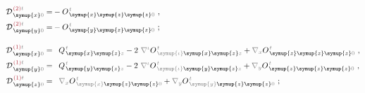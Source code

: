 \begin{subequations} \label{eq:D^(2-0)_0=}
\begin{align}
	{\mathcal{D}}^{\;\!\textcolor{Maroon}{(2)}\mathcolor{gray}{t}}_{\;\! \symup{x} \mathcolor{gray}{0}} = &- O^{\;\!\mathcolor{gray}{t}}_{\;\! \symup{x}\symup{z}\symup{z}\mathcolor{gray}{0}}~, \label{eq:D^(2)_x0=} \\
	{\mathcal{D}}^{\;\!\textcolor{Maroon}{(2)}\mathcolor{gray}{t}}_{\;\! \symup{y} \mathcolor{gray}{0}} = &- O^{\;\!\mathcolor{gray}{t}}_{\;\! \symup{y}\symup{z}\symup{z}\mathcolor{gray}{0}}~; \label{eq:D^(2)_y0=} \\[1.0em]
	{\mathcal{D}}^{\;\!\textcolor{Maroon}{(1)}\mathcolor{gray}{t}}_{\;\! \symup{x} \mathcolor{gray}{0}} = &\hphantom{+} Q^{\;\!\mathcolor{gray}{t}}_{\;\! \symup{x}\symup{z}\mathcolor{gray}{z}} - 2~ \mathcolor{gray}{\nabla^\iota} O^{\;\!\mathcolor{gray}{t}}_{\;\! \mathcolor{gray}{\symup{\iota}} \symup{x}\symup{z}\mathcolor{gray}{z}} + \mathcolor{gray}{\nabla_x} O^{\;\!\mathcolor{gray}{t}}_{\;\! \symup{z}\symup{z}\symup{z}\mathcolor{gray}{0}}~, \label{eq:D^(1)_x0=} \\
	{\mathcal{D}}^{\;\!\textcolor{Maroon}{(1)}\mathcolor{gray}{t}}_{\;\! \symup{y} \mathcolor{gray}{0}} = &\hphantom{+} Q^{\;\!\mathcolor{gray}{t}}_{\;\! \symup{y}\symup{z}\mathcolor{gray}{z}} - 2~ \mathcolor{gray}{\nabla^\iota} O^{\;\!\mathcolor{gray}{t}}_{\;\! \mathcolor{gray}{\symup{\iota}} \symup{y}\symup{z}\mathcolor{gray}{z}} + \mathcolor{gray}{\nabla_y} O^{\;\!\mathcolor{gray}{t}}_{\;\! \symup{z}\symup{z}\symup{z}\mathcolor{gray}{0}}~, \label{eq:D^(1)_y0=} \\
	{\mathcal{D}}^{\;\!\textcolor{Maroon}{(1)}\mathcolor{gray}{t}}_{\;\! \symup{z} \mathcolor{gray}{0}} = &\hphantom{+} \mathcolor{gray}{\nabla_x} O^{\;\!\mathcolor{gray}{t}}_{\;\! \mathcolor{gray}{\symup{x}} \symup{z} \symup{z} \mathcolor{gray}{0}} + \mathcolor{gray}{\nabla_y} O^{\;\!\mathcolor{gray}{t}}_{\;\! \mathcolor{gray}{\symup{y}} \symup{z} \symup{z} \mathcolor{gray}{0}}~; \label{eq:D^(1)_z0=} \\[1.0em]

\end{align}
\end{subequations}
